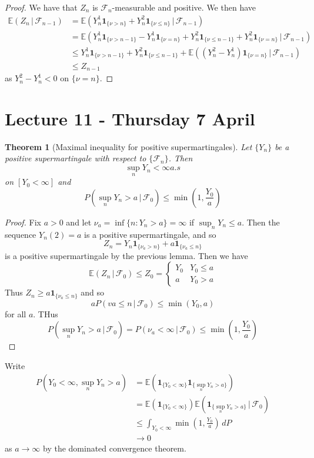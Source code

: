 \documentclass[10pt, oneside, reqno]{amsart}
\theoremstyle{plain}%
\newtheorem{thm}{Theorem}[section]
\theoremstyle{definition}
\theoremstyle{remark}
\newcommand{\given}{ \, | \,}
\newcommand{\sigf}{\mathcal{F}}
\newcommand{\E}{\mathbb{E}}
\newcommand{\indic}[1]{\mathbf{1}_{\{ #1 \}} }
\begin{document}
\begin{proof}
	We have that $Z_n$ is $\sigf_n$-measurable and positive.  We then have \begin{align*}
		\E(Z_n \given \sigf_{n-1}) &= \E( Y_n^1 \indic{\nu > n} + Y_n^2 \indic{\nu \leq n} \given \sigf_{n-1}) \\
		&= \E( Y_n^1 \indic{\nu > n-1} - Y_n^1 \indic{\nu = n} + Y_n^2 \indic{\nu \leq n-1} + Y_n^2 \indic{\nu = n}\given \sigf_{n-1}) \\
		&\leq Y_n^1 \indic{\nu > n-1} + Y_n^2 \indic{\nu \leq n-1} + \E((Y_n^2 - Y_n^1) \indic{\nu = n} \given \sigf_{n-1}) \\
		&\leq Z_{n-1} 
	\end{align*} as $Y_n^2 - Y_n^1 < 0$ on $\{ \nu = n \}$.  
\end{proof}

\section{Lecture 11 - Thursday 7 April} %
\label{sec:lecture_11_thursday_7_april}

\begin{thm}[Maximal inequality for positive supermartingales]
	Let $\{ Y_n \}$ be a positive supermartingale with respect to $\{ \sigf_n \}$.  Then \[
		\sup_{n } Y_n < \infty a.s
	\] on $[Y_0 < \infty]$ and \[
		P(\sup_{n} Y_n > a \, | \, \sigf_0 ) \leq \min(1, \frac{Y_0}{a})
	\]
\end{thm}
\begin{proof}
	Fix $a > 0$ and let $\nu_a= \inf \{ n : Y_n > a \} = \infty$ if $\sup_n Y_n \leq a$.  Then the sequence $Y_n(2) = a$ is a positive supermartingale, and so \[
		Z_n = Y_n \indic{\nu_a> n} + a \indic{\nu_a\leq n}
	\] is a positive supermartingale by the previous lemma.  Then we have \[
		\E(Z_n \, | \, \sigf_0) \leq Z_0 = \begin{cases}
			Y_0 & Y_0 \leq a \\
			a  & Y_0 > a
		\end{cases}
	\]  Thus $Z_n \geq a \indic{\nu_a\leq n}$ and so \[
		a P({va \leq n \given \sigf_0}) \leq \min(Y_0, a) 
	\] for all $a$.  THus \[
		P(\sup_{n} Y_n > a \given \sigf_0 ) = P(\nu_a< \infty \given \sigf_0) \leq \min(1, \frac{Y_0}{a})
	\]
\end{proof}

Write \begin{align*}
	P(Y_0 < \infty, \sup_{n} Y_n > a) &= \E(\indic{Y_0 < \infty} \indic{\sup_n Y_n > a}) \\
									&= \E(\indic{Y_0 < \infty}) \E(\indic{\sup_n Y_n > a} \given \sigf_0) \\
									&\leq \int_{Y_0 < \infty} \min(1, \frac{Y_0}{a}) \, dP \\
									&\rightarrow 0
\end{align*} as $a \rightarrow \infty$ by the dominated convergence theorem.  
\end{document}

